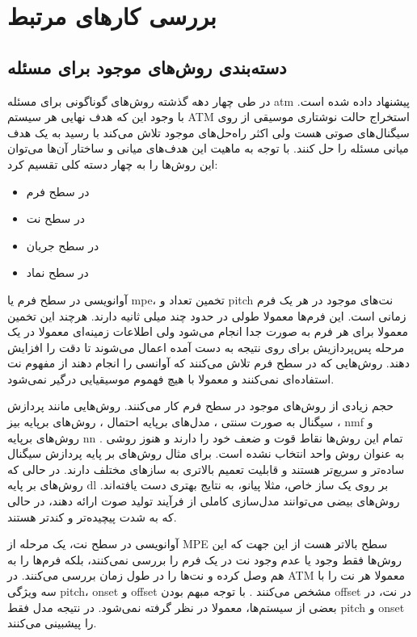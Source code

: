 \chapter{بررسی کارهای مرتبط}
\section{دسته‌بندی روش‌های موجود برای مسئله}
در طی چهار دهه گذشته روش‌های گوناگونی برای مسئله \gls{atm} پیشنهاد داده شده است.
با وجود این که هدف نهایی هر سیستم \gls{ATM} استخراج حالت نوشتاری موسیقی از روی
سیگنال‌های صوتی هست ولی اکثر راه‌حل‌های موجود تلاش می‌کند با رسید به یک هدف
میانی مسئله را حل کنند. با توجه به ماهیت این هدف‌های میانی و ساختار آن‌ها
می‌توان این روش‌ها را به چهار دسته کلی تقسیم کرد:
\begin{itemize}
    \item در سطح فرم
    \item در سطح نت
    \item در سطح جریان
    \item در سطح نماد
\end{itemize}

آوانویسی در سطح فرم یا \gls{mpe}، تخمین تعداد و \gls{pitch} نت‌های موجود در هر
یک فرم زمانی است. این فرم‌ها معمولا طولی در حدود چند میلی ثانیه دارند. هرچند این
تخمین معمولا برای هر فرم به صورت جدا انجام می‌شود ولی اطلاعات زمینه‌ای معمولا در
یک مرحله‌ پس‌پردازیش برای روی نتیجه به دست آمده اعمال می‌شوند تا دقت را افزایش
دهند. روش‌هایی که در سطح فرم تلاش می‌کنند که آوانسی را انجام دهند از مفهوم نت
استفاده‌ای نمی‌کنند و معمولا با هیچ فهموم موسیقیایی درگیر نمی‌شود.

حجم زیادی از روش‌های موجود در سطح فرم کار می‌کنند. روش‌هایی مانند پردازش سیگنال
به صورت سنتی \cite{emiya2009multipitch,su2015combining}، مدل‌های برپایه احتمال
\cite{duan2010multiple}، روش‌های برپایه بیز \cite{peeling2009generative}، \gls{nmf}
\cite{smaragdis2003non,vincent2009adaptive,benetos2013automatic,fuentes2013harmonic}
و روش‌های برپایه \gls{nn} \cite{sigtia2016end,kelz2016potential}. تمام این
روش‌ها نقاط قوت و ضعف خود را دارند و هنوز روشی به عنوان روش واحد انتخاب نشده
است. برای مثال روش‌های بر پایه پردازش سیگنال ساده‌تر و سریع‌تر هستند و قابلیت
تعمیم بالاتری به سازهای مختلف دارند. در حالی که روش‌های بر پایه \gls{dl} بر روی
یک ساز خاص، مثلا پیانو، به نتایج بهتری دست یافته‌اند. روش‌های بیضی می‌توانند
مدل‌سازی کاملی از فرآیند تولید صوت ارائه دهند، در حالی که به شدت پیچیده‌تر و
کندتر هستند.

آوانویسی در سطح نت، یک مرحله از \gls{MPE} سطح بالاتر هست از این جهت که این
روش‌ها فقط وجود یا عدم وجود نت در یک فرم را بررسی نمی‌کنند، بلکه فرم‌ها را به هم
وصل کرده و نت‌ها را در طول زمان بررسی می‌کنند. در \gls{ATM} معمولا هر نت را با
سه ویژگی \gls{pitch}، onset و offset مشخص می‌کنند \cite{klapuri2007signal}. با
توجه مبهم بودن offset در نت، در بعضی از سیستم‌ها، معمولا در نظر گرفته نمی‌شود.
در نتیجه مدل فقط \gls{pitch} و onset را پیشبینی می‌کنند.

